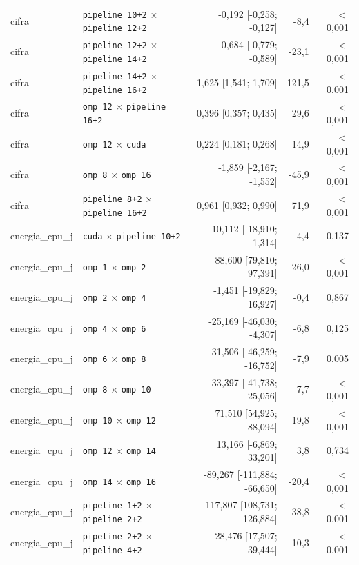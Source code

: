 \begin{tabular}{llrrr}
cifra & \texttt{pipeline 10+2} $\times$ \texttt{pipeline 12+2} & -0,192 [-0,258; -0,127] & -8,4 & $<$0,001 \\
cifra & \texttt{pipeline 12+2} $\times$ \texttt{pipeline 14+2} & -0,684 [-0,779; -0,589] & -23,1 & $<$0,001 \\
cifra & \texttt{pipeline 14+2} $\times$ \texttt{pipeline 16+2} & 1,625 [1,541; 1,709] & 121,5 & $<$0,001 \\
cifra & \texttt{omp 12} $\times$ \texttt{pipeline 16+2} & 0,396 [0,357; 0,435] & 29,6 & $<$0,001 \\
cifra & \texttt{omp 12} $\times$ \texttt{cuda} & 0,224 [0,181; 0,268] & 14,9 & $<$0,001 \\
cifra & \texttt{omp 8} $\times$ \texttt{omp 16} & -1,859 [-2,167; -1,552] & -45,9 & $<$0,001 \\
cifra & \texttt{pipeline 8+2} $\times$ \texttt{pipeline 16+2} & 0,961 [0,932; 0,990] & 71,9 & $<$0,001 \\
energia\_cpu\_j & \texttt{cuda} $\times$ \texttt{pipeline 10+2} & -10,112 [-18,910; -1,314] & -4,4 & 0,137 \\
energia\_cpu\_j & \texttt{omp 1} $\times$ \texttt{omp 2} & 88,600 [79,810; 97,391] & 26,0 & $<$0,001 \\
energia\_cpu\_j & \texttt{omp 2} $\times$ \texttt{omp 4} & -1,451 [-19,829; 16,927] & -0,4 & 0,867 \\
energia\_cpu\_j & \texttt{omp 4} $\times$ \texttt{omp 6} & -25,169 [-46,030; -4,307] & -6,8 & 0,125 \\
energia\_cpu\_j & \texttt{omp 6} $\times$ \texttt{omp 8} & -31,506 [-46,259; -16,752] & -7,9 & 0,005 \\
energia\_cpu\_j & \texttt{omp 8} $\times$ \texttt{omp 10} & -33,397 [-41,738; -25,056] & -7,7 & $<$0,001 \\
energia\_cpu\_j & \texttt{omp 10} $\times$ \texttt{omp 12} & 71,510 [54,925; 88,094] & 19,8 & $<$0,001 \\
energia\_cpu\_j & \texttt{omp 12} $\times$ \texttt{omp 14} & 13,166 [-6,869; 33,201] & 3,8 & 0,734 \\
energia\_cpu\_j & \texttt{omp 14} $\times$ \texttt{omp 16} & -89,267 [-111,884; -66,650] & -20,4 & $<$0,001 \\
energia\_cpu\_j & \texttt{pipeline 1+2} $\times$ \texttt{pipeline 2+2} & 117,807 [108,731; 126,884] & 38,8 & $<$0,001 \\
energia\_cpu\_j & \texttt{pipeline 2+2} $\times$ \texttt{pipeline 4+2} & 28,476 [17,507; 39,444] & 10,3 & $<$0,001 \\

\end{tabular}
